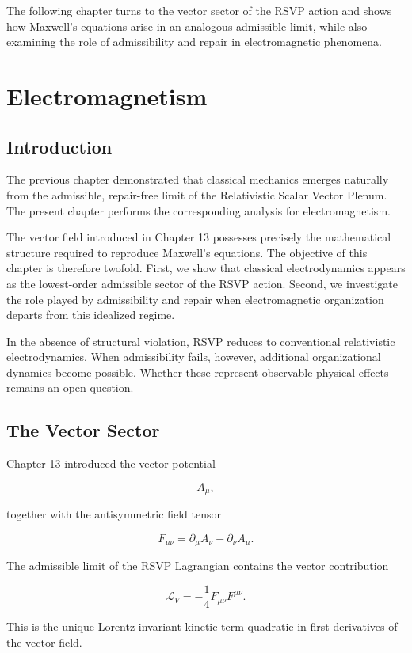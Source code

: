 \documentclass[11pt,oneside]{book}
\numberwithin{equation}{chapter}
\theoremstyle{definition}
\theoremstyle{plain}
\begin{document}
The following chapter turns to the vector sector of the RSVP action and
shows how Maxwell's equations arise in an analogous admissible limit, while
also examining the role of admissibility and repair in electromagnetic
phenomena.

\chapter{Electromagnetism}

\section{Introduction}

The previous chapter demonstrated that classical mechanics emerges naturally
from the admissible, repair-free limit of the Relativistic Scalar Vector
Plenum. The present chapter performs the corresponding analysis for
electromagnetism.

The vector field introduced in Chapter 13 possesses precisely the
mathematical structure required to reproduce Maxwell's equations. The
objective of this chapter is therefore twofold. First, we show that
classical electrodynamics appears as the lowest-order admissible sector of
the RSVP action. Second, we investigate the role played by admissibility and
repair when electromagnetic organization departs from this idealized
regime.

In the absence of structural violation, RSVP reduces to conventional
relativistic electrodynamics. When admissibility fails, however, additional
organizational dynamics become possible. Whether these represent observable
physical effects remains an open question.

\section{The Vector Sector}

Chapter 13 introduced the vector potential

\[
A_\mu,
\]

together with the antisymmetric field tensor

\[
F_{\mu\nu}
=
\partial_\mu A_\nu
-
\partial_\nu A_\mu.
\]

The admissible limit of the RSVP Lagrangian contains the vector contribution

\[
\boxed{
\mathcal L_V
=
-\frac14
F_{\mu\nu}F^{\mu\nu}.
}
\]

This is the unique Lorentz-invariant kinetic term quadratic in first
derivatives of the vector field.
\end{document}
